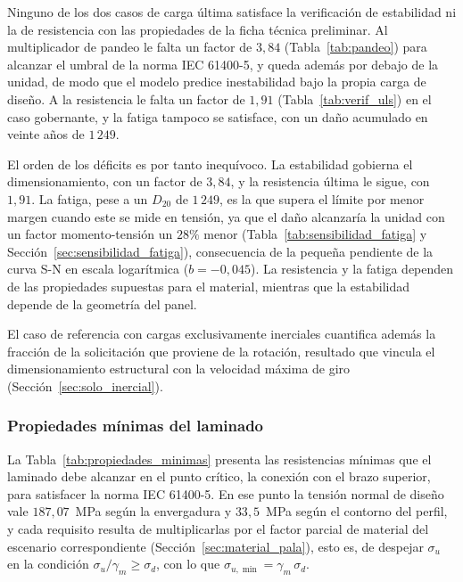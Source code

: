 Ninguno de los dos casos de carga última satisface la verificación de estabilidad ni la de resistencia con las propiedades de la ficha técnica preliminar. Al multiplicador de pandeo le falta un factor de $3{,}84$ (Tabla~\ref{tab:pandeo}) para alcanzar el umbral de la norma IEC 61400-5, y queda además por debajo de la unidad, de modo que el modelo predice inestabilidad bajo la propia carga de diseño. A la resistencia le falta un factor de $1{,}91$ (Tabla~\ref{tab:verif_uls}) en el caso gobernante, y la fatiga tampoco se satisface, con un daño acumulado en veinte años de $1\,249$.

El orden de los déficits es por tanto inequívoco. La estabilidad gobierna el dimensionamiento, con un factor de $3{,}84$, y la resistencia última le sigue, con $1{,}91$. La fatiga, pese a un $D_{20}$ de $1\,249$, es la que supera el límite por menor margen cuando este se mide en tensión, ya que el daño alcanzaría la unidad con un factor momento-tensión un $28\%$ menor (Tabla~\ref{tab:sensibilidad_fatiga} y Sección~\ref{sec:sensibilidad_fatiga}), consecuencia de la pequeña pendiente de la curva S-N en escala logarítmica ($b = -0{,}045$). La resistencia y la fatiga dependen de las propiedades supuestas para el material, mientras que la estabilidad depende de la geometría del panel.

El caso de referencia con cargas exclusivamente inerciales cuantifica además la fracción de la solicitación que proviene de la rotación, resultado que vincula el dimensionamiento estructural con la velocidad máxima de giro (Sección~\ref{sec:solo_inercial}).

\subsubsection{Propiedades mínimas del laminado}
\label{sec:propiedades_minimas}

La Tabla~\ref{tab:propiedades_minimas} presenta las resistencias mínimas que el laminado debe alcanzar en el punto crítico, la conexión con el brazo superior, para satisfacer la norma IEC 61400-5. En ese punto la tensión normal de diseño vale $187{,}07$~MPa según la envergadura y $33{,}5$~MPa según el contorno del perfil, y cada requisito resulta de multiplicarlas por el factor parcial de material del escenario correspondiente (Sección~\ref{sec:material_pala}), esto es, de despejar $\sigma_u$ en la condición $\sigma_u/\gamma_m \geq \sigma_d$, con lo que $\sigma_{u,\min} = \gamma_m\,\sigma_d$.

